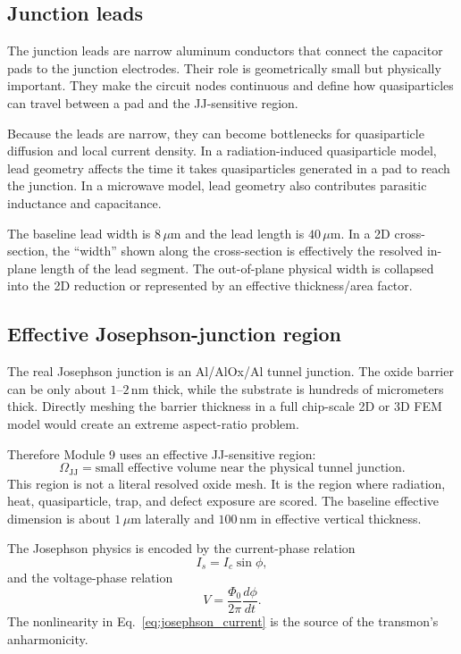 \documentclass[11pt]{article}
\begin{document}
\subsection{Junction leads}
The junction leads are narrow aluminum conductors that connect the capacitor pads to the junction electrodes. Their role is geometrically small but physically important. They make the circuit nodes continuous and define how quasiparticles can travel between a pad and the JJ-sensitive region.

Because the leads are narrow, they can become bottlenecks for quasiparticle diffusion and local current density. In a radiation-induced quasiparticle model, lead geometry affects the time it takes quasiparticles generated in a pad to reach the junction. In a microwave model, lead geometry also contributes parasitic inductance and capacitance.

The baseline lead width is $8\,\mu\mathrm{m}$ and the lead length is $40\,\mu\mathrm{m}$. In a 2D cross-section, the ``width'' shown along the cross-section is effectively the resolved in-plane length of the lead segment. The out-of-plane physical width is collapsed into the 2D reduction or represented by an effective thickness/area factor.

\subsection{Effective Josephson-junction region}
The real Josephson junction is an Al/AlOx/Al tunnel junction. The oxide barrier can be only about $1$--$2\,\mathrm{nm}$ thick, while the substrate is hundreds of micrometers thick. Directly meshing the barrier thickness in a full chip-scale 2D or 3D FEM model would create an extreme aspect-ratio problem.

Therefore Module 9 uses an effective JJ-sensitive region:
\begin{equation}
    \Omega_{\mathrm{JJ}} = \text{small effective volume near the physical tunnel junction}.
\end{equation}
This region is not a literal resolved oxide mesh. It is the region where radiation, heat, quasiparticle, trap, and defect exposure are scored. The baseline effective dimension is about $1\,\mu\mathrm{m}$ laterally and $100\,\mathrm{nm}$ in effective vertical thickness.

The Josephson physics is encoded by the current-phase relation
\begin{equation}
    I_s = I_c\sin\phi,
    \label{eq:josephson_current}
\end{equation}
and the voltage-phase relation
\begin{equation}
    V = \frac{\Phi_0}{2\pi}\frac{d\phi}{dt}.
    \label{eq:josephson_voltage}
\end{equation}
The nonlinearity in Eq.~\eqref{eq:josephson_current} is the source of the transmon's anharmonicity.
\end{document}
